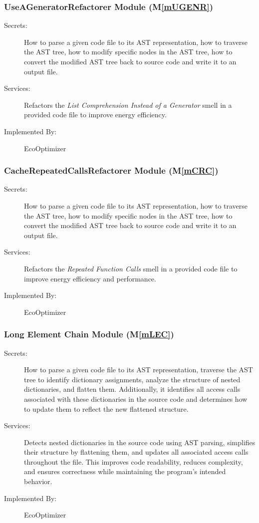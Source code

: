 \documentclass[12pt, titlepage]{article}
\newcommand{\mref}[1]{M\ref{#1}}
\begin{document}
\subsubsection{UseAGeneratorRefactorer Module (\mref{mUGENR})}
\begin{description}
    \item[Secrets:] How to parse a given code file to its AST representation, how to traverse the AST tree, how to modify specific nodes in the AST tree, how to convert the modified AST tree back to source code and write it to an output file.
    \item[Services:] Refactors the \textit{List Comprehension Instead of a Generator} smell in a provided code file to improve energy efficiency.
    \item[Implemented By:] EcoOptimizer
\end{description}

\subsubsection{CacheRepeatedCallsRefactorer Module (\mref{mCRC})}
\begin{description}
    \item[Secrets:] How to parse a given code file to its AST representation, how to traverse the AST tree, how to modify specific nodes in the AST tree, how to convert the modified AST tree back to source code and write it to an output file.
    \item[Services:] Refactors the \textit{Repeated Function Calls} smell in a provided code file to improve energy efficiency and performance.
    \item[Implemented By:] EcoOptimizer
\end{description}

\subsubsection{Long Element Chain Module (\mref{mLEC})}


\begin{description}
    \item[Secrets:] How to parse a given code file to its AST representation, traverse the 
    AST tree to identify dictionary assignments, analyze the structure of nested dictionaries,
     and flatten them. Additionally, it identifies all access calls associated with these dictionaries
      in the source code and determines how to update them to reflect the new flattened structure.
    \item[Services:] Detects nested dictionaries in the source code using AST parsing, simplifies their 
    structure by flattening them, and updates all associated access calls throughout the file. This improves 
    code readability, reduces complexity, and ensures correctness while maintaining the program's intended behavior.
    \item[Implemented By:] EcoOptimizer
\end{description}
\end{document}
